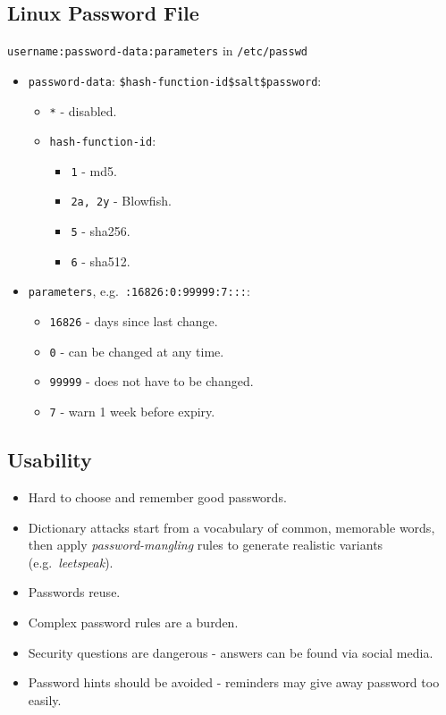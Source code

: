\documentclass[11pt]{article}
\begin{document}
\subsection{Linux Password File}
\texttt{username:password-data:parameters} in \texttt{/etc/passwd}
\begin{itemize}
  \item \texttt{password-data}: \texttt{\$hash-function-id\$salt\$password}:
    \begin{itemize}
      \item \texttt{*} - disabled.
      \item \texttt{hash-function-id}:
      \begin{itemize}
        \item \texttt{1} - md5.
        \item \texttt{2a, 2y} - Blowfish.
        \item \texttt{5} - sha256.
        \item \texttt{6} - sha512.
      \end{itemize}
    \end{itemize}
  \item \texttt{parameters}, e.g.\ \texttt{:16826:0:99999:7:::}:
    \begin{itemize}
      \item \texttt{16826} - days since last change.
      \item \texttt{0} - can be changed at any time.
      \item \texttt{99999} - does not have to be changed.
      \item \texttt{7} - warn 1 week before expiry.
    \end{itemize}
\end{itemize}

\subsection{Usability}
\begin{itemize}
  \item Hard to choose and remember good passwords.
  \item Dictionary attacks start from a vocabulary of common, memorable words, then apply \textit{password-mangling} rules to generate realistic variants (e.g.\ \textit{leetspeak}).
  \item Passwords reuse.
  \item Complex password rules are a burden.
  \item Security questions are dangerous - answers can be found via social media.
  \item Password hints should be avoided - reminders may give away password too easily.
\end{itemize}
\end{document}
